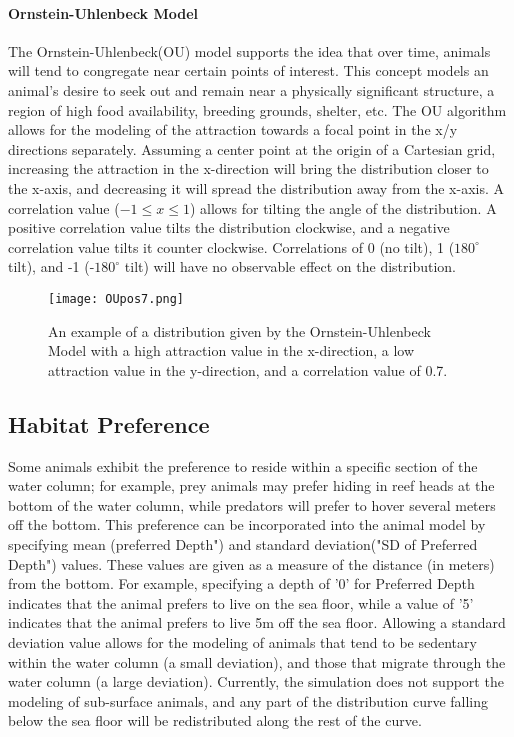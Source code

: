 \paragraph{Ornstein-Uhlenbeck Model}
\label{ouModel}
The Ornstein-Uhlenbeck(OU) model\cite{OU} supports the idea that over time, animals will tend to congregate near certain points of interest.  This concept models an animal's desire to seek out and remain near a physically significant structure, a region of high food availability, breeding grounds, shelter, etc.  The OU algorithm allows for the modeling of the attraction towards a focal point in the x/y directions separately.  Assuming a center point at the origin of a Cartesian grid, increasing the attraction in the x-direction will bring the distribution closer to the x-axis, and decreasing it will spread the distribution away from the x-axis.  A correlation value ($-1\le x \le 1$) allows for tilting the angle of the distribution.  A positive correlation value tilts the distribution clockwise, and a negative correlation value tilts it counter clockwise.  Correlations of 0 (no tilt), 1 ($180^{\circ}$ tilt), and -1 (-$180^{\circ}$ tilt) will have no observable effect on the distribution.
\begin{figure}[b]
	\label{OUimg}
	\centering
	\texttt{[image: OUpos7.png]}
	\caption{}\label{ouimg}
	\caption{An example of a distribution given by the Ornstein-Uhlenbeck Model with a high attraction value in the x-direction, a low attraction value in the y-direction, and a correlation value of 0.7.}
\end{figure}


\subsection{Habitat Preference}
\label{habitatPref}
Some animals exhibit the preference to reside within a specific section of the water column; for example, prey animals may prefer hiding in reef heads at the bottom of the water column, while predators will prefer to hover several meters off the bottom.  This preference can be incorporated into the animal model by specifying mean (preferred Depth") and standard deviation("SD of Preferred Depth") values.  These values are given as a measure of the distance (in meters) from the bottom.  For example, specifying a depth of '0' for Preferred Depth indicates that the animal prefers to live on the sea floor, while a value of '5' indicates that the animal prefers to live 5m off the sea floor.  Allowing a standard deviation value allows for the modeling of animals that tend to be sedentary within the water column (a small deviation), and those that migrate through the water column (a large deviation).  Currently, the simulation does not support the modeling of sub-surface animals, and any part of the distribution curve falling below the sea floor will be redistributed along the rest of the curve. 


